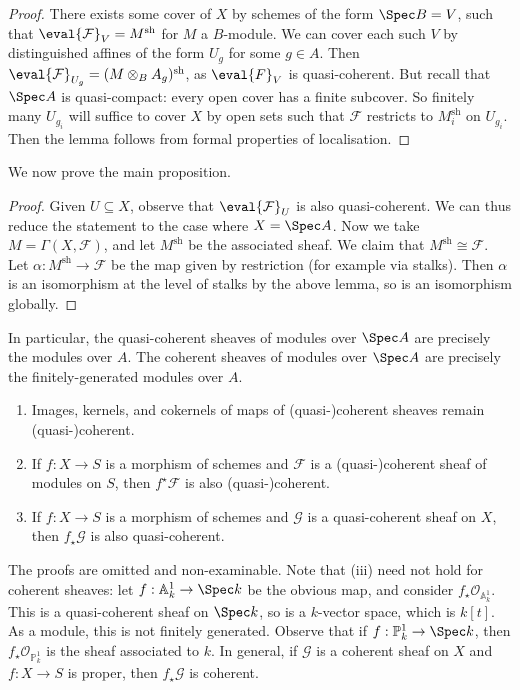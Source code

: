\begin{proof}
    There exists some cover of \( X \) by schemes of the form \( \Spec B = V \), such that \( \eval{\mathcal F}_V = M^{\mathrm{sh}} \) for \( M \) a \( B \)-module.
    We can cover each such \( V \) by distinguished affines of the form \( U_g \) for some \( g \in A \).
    Then \( \eval{\mathcal F}_{U_g} = (M \otimes_B A_g)^{\mathrm{sh}} \), as \( \eval{F}_V \) is quasi-coherent.
    But recall that \( \Spec A \) is quasi-compact: every open cover has a finite subcover.
    So finitely many \( U_{g_i} \) will suffice to cover \( X \) by open sets such that \( \mathcal F \) restricts to \( M_i^{\mathrm{sh}} \) on \( U_{g_i} \).
    Then the lemma follows from formal properties of localisation.
\end{proof}
We now prove the main proposition.
\begin{proof}
    Given \( U \subseteq X \), observe that \( \eval{\mathcal F}_U \) is also quasi-coherent.
    We can thus reduce the statement to the case where \( X = \Spec A \).
    Now we take \( M = \Gamma(X, \mathcal F) \), and let \( M^{\mathrm{sh}} \) be the associated sheaf.
    We claim that \( M^{\mathrm{sh}} \cong \mathcal F \).
    Let \( \alpha : M^{\mathrm{sh}} \to \mathcal F \) be the map given by restriction (for example via stalks).
    Then \( \alpha \) is an isomorphism at the level of stalks by the above lemma, so is an isomorphism globally.
\end{proof}
In particular, the quasi-coherent sheaves of modules over \( \Spec A \) are precisely the modules over \( A \).
The coherent sheaves of modules over \( \Spec A \) are precisely the finitely-generated modules over \( A \).
\begin{proposition}
    \begin{enumerate}
        \item Images, kernels, and cokernels of maps of (quasi-)coherent sheaves remain (quasi-)coherent.
        \item If \( f : X \to S \) is a morphism of schemes and \( \mathcal F \) is a (quasi-)coherent sheaf of modules on \( S \), then \( f^\star \mathcal F \) is also (quasi-)coherent.
        \item If \( f : X \to S \) is a morphism of schemes and \( \mathcal G \) is a quasi-coherent sheaf on \( X \), then \( f_\star \mathcal G \) is also quasi-coherent.
    \end{enumerate}
\end{proposition}
The proofs are omitted and non-examinable.
Note that (iii) need not hold for coherent sheaves: let \( f : \mathbb A^1_k \to \Spec k \) be the obvious map, and consider \( f_\star \mathcal O_{\mathbb A^1_k} \).
This is a quasi-coherent sheaf on \( \Spec k \), so is a \( k \)-vector space, which is \( k[t] \).
As a module, this is not finitely generated.
Observe that if \( f : \mathbb P^1_k \to \Spec k \), then \( f_\star \mathcal O_{\mathbb P^1_k} \) is the sheaf associated to \( k \).
In general, if \( \mathcal G \) is a coherent sheaf on \( X \) and \( f : X \to S \) is proper, then \( f_\star \mathcal G \) is coherent.

